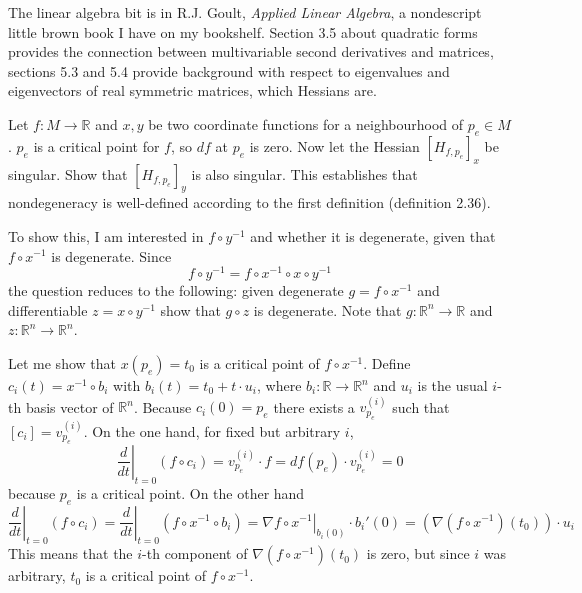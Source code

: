 \documentclass[12pt]{article}
\begin{document}
The linear algebra bit is in R.J. Goult, \emph{Applied Linear
  Algebra}, a nondescript little brown book I have on my bookshelf.
Section 3.5 about quadratic forms provides the connection between
multivariable second derivatives and matrices, sections 5.3 and 5.4
provide background with respect to eigenvalues and eigenvectors of
real symmetric matrices, which Hessians are.

Let $f:M\rightarrow{}\mathbb{R}$ and $x,y$ be two coordinate functions
for a neighbourhood of $p_{e}\in{}M$. $p_{e}$ is a critical point for
$f$, so $df$ at $p_{e}$ is zero. Now let the Hessian
$[H_{f,p_{e}}]_{x}$ be singular. Show that $[H_{f,p_{e}}]_{y}$ is also
singular. This establishes that nondegeneracy is well-defined
according to the first definition (definition 2.36).

To show this, I am interested in $f\circ{}y^{-1}$ and whether it is
degenerate, given that $f\circ{}x^{-1}$ is degenerate. Since
\begin{equation}
  \label{eq:quaiquuo}
f\circ{}y^{-1}=f\circ{}x^{-1}\circ{}x\circ{}y^{-1}
\end{equation}
the question reduces to the following: given degenerate
$g=f\circ{}x^{-1}$ and differentiable $z=x\circ{}y^{-1}$ show that
$g\circ{}z$ is degenerate. Note that
$g:\mathbb{R}^{n}\rightarrow\mathbb{R}$ and
$z:\mathbb{R}^{n}\rightarrow\mathbb{R}^{n}$.


Let me show that $x(p_{e})=t_{0}$ is a critical point of
$f\circ{}x^{-1}$. Define $c_{i}(t)=x^{-1}\circ{}b_{i}$ with
$b_{i}(t)=t_{0}+t\cdot{}u_{i}$, where
$b_{i}:\mathbb{R}\rightarrow\mathbb{R}^{n}$ and $u_{i}$ is the usual
$i$-th basis vector of $\mathbb{R}^{n}$. Because $c_{i}(0)=p_{e}$
there exists a $v_{p_{e}}^{(i)}$ such that $[c_{i}]=v_{p_{e}}^{(i)}$.
On the one hand, for fixed but arbitrary $i$,
\begin{equation}
  \label{eq:uvoiquie}
   \left.\frac{d}{dt}\right\vert_{t=0}(f\circ{}c_{i})=v_{p_{e}}^{(i)}\cdot{}f=df(p_{e})\cdot{}v_{p_{e}}^{(i)}=0
\end{equation}
because $p_{e}$ is a critical point. On the other hand
\begin{equation}
  \label{eq:fushahch}
    \left.\frac{d}{dt}\right\vert_{t=0}(f\circ{}c_{i})=\left.\frac{d}{dt}\right\vert_{t=0}(f\circ{}x^{-1}\circ{}b_{i})=\left.\nabla{}f\circ{}x^{-1}\right\vert_{b_{i}(0)}\cdot{}b_{i}'(0)=\left(\nabla(f\circ{}x^{-1})(t_{0})\right)\cdot{}u_{i}
\end{equation}
This means that the $i$-th component of
$\nabla(f\circ{}x^{-1})(t_{0})$ is zero, but since $i$ was arbitrary,
$t_{0}$ is a critical point of $f\circ{}x^{-1}$.
\end{document}
